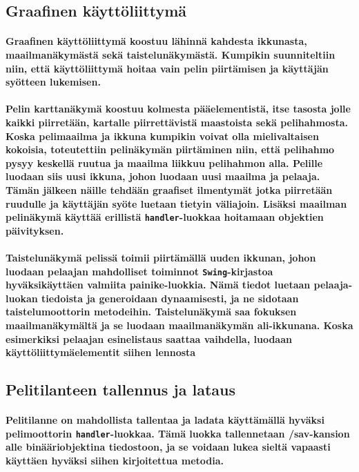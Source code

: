 \documentclass[10pt,a4paper,draft]{article}
\begin{document}
\subsection{Graafinen käyttöliittymä}
\paragraph{Graafinen käyttöliittymä koostuu lähinnä kahdesta ikkunasta, maailmanäkymästä se\-kä taistelunäkymästä. Kumpikin suunniteltiin niin, että käyttöliittymä hoitaa vain pelin piirtämisen ja käyttäjän syötteen lukemisen.}
\paragraph{Pelin karttanäkymä koostuu kolmesta pääelementistä, itse tasosta jolle kaikki piirretään, kartalle piirrettävistä maastoista sekä pelihahmosta. Koska pelimaailma ja ikkuna kumpikin voivat olla mielivaltaisen kokoisia, toteutettiin pelinäkymän piir\-tä\-mi\-nen niin, että pelihahmo pysyy keskellä ruutua ja maailma liikkuu pelihahmon alla. Pelille luodaan siis uusi ikkuna, johon luodaan uusi maailma ja pelaaja. Tämän jälkeen näille tehdään graafiset ilmentymät jotka piirretään ruudulle ja käyttäjän syöte luetaan tietyin väliajoin. Lisäksi maailman pelinäkymä käyttää erillistä \texttt{handler}-luokkaa hoitamaan objektien päivityksen.}
\paragraph{Taistelunäkymä pelissä toimii piirtämällä uuden ikkunan, johon luodaan pelaajan mahdolliset toiminnot \texttt{Swing}-kirjastoa hyväksikäyttäen valmiita painike-luokkia. Nä\-mä tiedot luetaan pelaaja-luokan tiedoista ja generoidaan dynaamisesti, ja ne sidotaan taistelumoottorin metodeihin. Taistelunäkymä saa fokuksen maailmanäkymältä ja se luodaan maailmanäkymän ali-ikkunana. Koska esimerkiksi pelaajan esinelistaus saattaa vaihdella, luodaan käyttöliittymäelementit siihen lennosta}

\subsection{Pelitilanteen tallennus ja lataus}
\paragraph{Pelitilanne on mahdollista tallentaa ja ladata käyttämällä hyväksi pelimoottorin \texttt{han\-dler}-luokkaa. Tämä luokka tallennetaan /sav-kansion alle binääriobjektina tiedostoon, ja se voidaan lukea sieltä vapaasti käyttäen hyväksi siihen kirjoitettua metodia.}
\end{document}
